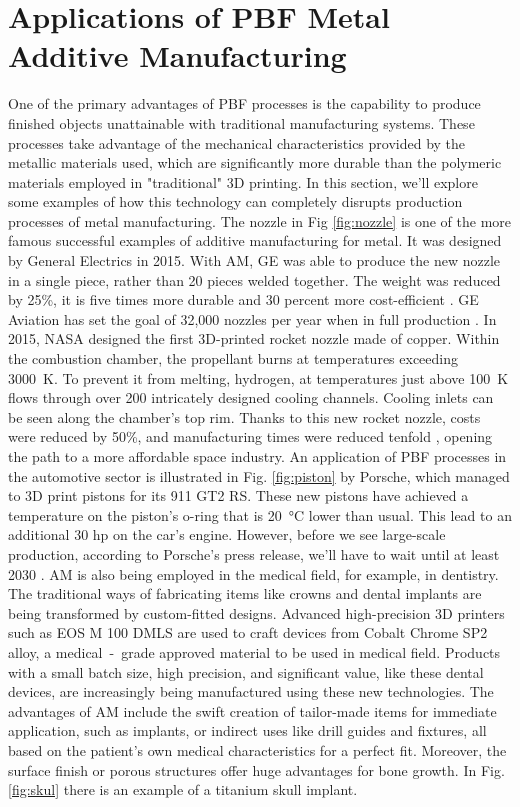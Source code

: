 
\section{Applications of PBF Metal Additive Manufacturing}
\label{sec:examplesPBF}
One of the primary advantages of PBF processes is the capability to produce finished objects unattainable with traditional manufacturing systems. These processes take advantage of the mechanical characteristics provided by the metallic materials used, which are significantly more durable than the polymeric materials employed in "traditional" 3D printing. In this section, we'll explore some examples of how this technology can completely disrupts production processes of metal manufacturing. The nozzle in Fig \ref{fig:nozzle} is one of the more famous successful examples of additive manufacturing for metal. It was designed by General Electrics in 2015. With AM, GE was able to produce the new nozzle in a single piece, rather than 20 pieces welded together. The weight was reduced by 25\%, it is five times more durable and 30 percent more cost-efficient \cite{amy_kover_transformation_2018}. GE Aviation has set the goal of 32,000 nozzles per year when in full production \cite{milewski_additive_2017}. In 2015, NASA designed the first 3D-printed rocket nozzle made of copper. Within the combustion chamber, the propellant burns at temperatures exceeding \SI{3000}{\kelvin}. To prevent it from melting, hydrogen, at temperatures just above \SI{100}{\kelvin} flows through over 200 intricately designed cooling channels. Cooling inlets can be seen along the chamber's top rim. Thanks to this new rocket nozzle, costs were reduced by 50\%, and manufacturing times were reduced tenfold \cite{tracy_mcmahan_nasa_2015}, opening the path to a more affordable space industry. An application of PBF processes in the automotive sector is illustrated in Fig. \ref{fig:piston} by Porsche, which managed to 3D print pistons for its 911 GT2 RS. These new pistons have achieved a temperature on the piston's o-ring that is \SI{20}{\degreeCelsius} lower than usual. This lead to an additional 30 hp on the car's engine. However, before we see large-scale production, according to Porsche's press release, we'll have to wait until at least 2030 \cite{roberto_baldwin_porsches_2020}. AM is also being employed in the medical field, for example, in dentistry. The traditional ways of fabricating items like crowns and dental implants are being transformed by custom-fitted designs. Advanced high-precision 3D printers such as EOS M 100 DMLS \cite{milewski_additive_2017} are used to craft devices from Cobalt Chrome SP2 alloy, a medical~-~grade approved material to be used in medical field. Products with a small batch size, high precision, and significant value, like these dental devices, are increasingly being manufactured using these new technologies. The advantages of AM include the swift creation of tailor-made items for immediate application, such as implants, or indirect uses like drill guides and fixtures, all based on the patient's own medical characteristics for a perfect fit. Moreover, the surface finish or porous structures offer huge advantages for bone growth. In Fig. \ref{fig:skul} there is an example of a titanium skull implant.
